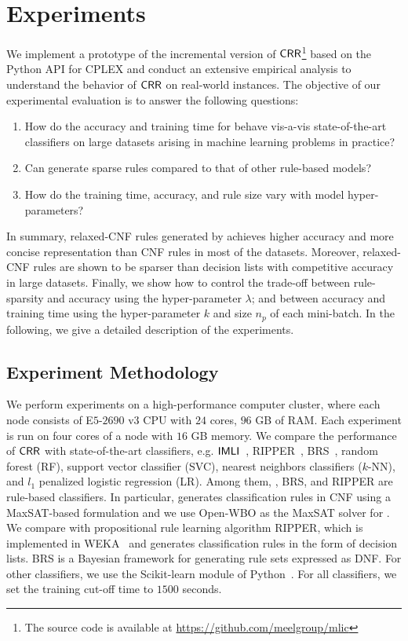 \section{Experiments}\label{interpretability_crr_sec:experiment}
We implement a prototype  of  the incremental version of $ \mathsf{CRR} $\footnote{The source code is available at \url{https://github.com/meelgroup/mlic}} based on the  Python API for CPLEX  and conduct an extensive  empirical analysis to understand the behavior of $\mathsf{CRR}$ on real-world instances. The objective of our experimental evaluation is to answer the following questions:


\begin{enumerate}
	\item How do the accuracy and training time for  {\crr}  behave vis-a-vis state-of-the-art classifiers on large datasets arising in machine learning problems in practice?
	\item Can {\crr} generate sparse rules compared to that of  other rule-based models? 
	\item How do the training time, accuracy, and rule size vary with model hyper-parameters?
\end{enumerate}


In summary, relaxed-CNF rules generated by {\crr} achieves higher accuracy and more concise representation than CNF rules in most of the datasets. Moreover, relaxed-CNF rules are shown to be sparser than decision lists with competitive accuracy in large datasets.  Finally, we show how to control the trade-off between rule-sparsity and accuracy using the hyper-parameter $ \lambda $; and between accuracy and training time using the hyper-parameter $ k $ and size $ n_p $ of each mini-batch. In the following, we give a detailed description of the experiments. 



\subsection{Experiment Methodology}
We perform experiments on a high-performance computer cluster, where each node consists of E$ 5$-$2690\text{ v}3 $ CPU with $ 24 $ cores, $ 96 $ GB of RAM. Each experiment is run on four cores of a node with $ 16 $ GB memory.   We compare the performance of  $ \mathsf{CRR} $   with  state-of-the-art classifiers, e.g. $ \mathsf{IMLI}  $~\cite{GM2019}, RIPPER~\cite{C1995}, BRS~\cite{WRDLKM2017},  random forest (RF), support vector classifier (SVC), nearest neighbors classifiers ($ k $-NN), and $ l_1 $ penalized logistic regression (LR). Among them, {\IMLI}, BRS, and RIPPER are rule-based classifiers. In particular,
{\IMLI} generates classification rules in CNF using a MaxSAT-based formulation and we use Open-WBO \cite{MML2014} as the MaxSAT solver for {\IMLI}. We compare with propositional rule learning algorithm RIPPER, which is implemented in WEKA~\cite{HFHPRW2009} and generates classification rules in the form of decision lists. BRS is a Bayesian framework for generating rule sets expressed as DNF. For  other classifiers, we use the Scikit-learn module of Python~\cite{PVGMTGB2011}. For all  classifiers, we set the training cut-off time to $ 1500 $  {seconds}. 

